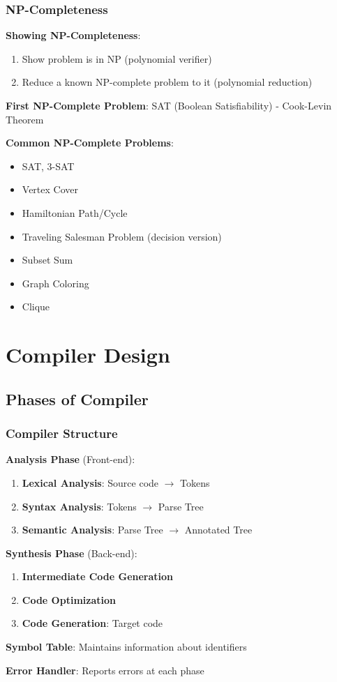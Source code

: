 \documentclass[12pt,a4paper]{report}
\begin{document}
\subsection{NP-Completeness}
\begin{concept}
\textbf{Showing NP-Completeness}:
\begin{enumerate}
    \item Show problem is in NP (polynomial verifier)
    \item Reduce a known NP-complete problem to it (polynomial reduction)
\end{enumerate}

\textbf{First NP-Complete Problem}: SAT (Boolean Satisfiability) - Cook-Levin Theorem

\textbf{Common NP-Complete Problems}:
\begin{itemize}
    \item SAT, 3-SAT
    \item Vertex Cover
    \item Hamiltonian Path/Cycle
    \item Traveling Salesman Problem (decision version)
    \item Subset Sum
    \item Graph Coloring
    \item Clique
\end{itemize}
\end{concept}

\chapter{Compiler Design}

\section{Phases of Compiler}

\subsection{Compiler Structure}
\begin{concept}
\textbf{Analysis Phase} (Front-end):
\begin{enumerate}
    \item \textbf{Lexical Analysis}: Source code $\to$ Tokens
    \item \textbf{Syntax Analysis}: Tokens $\to$ Parse Tree
    \item \textbf{Semantic Analysis}: Parse Tree $\to$ Annotated Tree
\end{enumerate}

\textbf{Synthesis Phase} (Back-end):
\begin{enumerate}
    \item \textbf{Intermediate Code Generation}
    \item \textbf{Code Optimization}
    \item \textbf{Code Generation}: Target code
\end{enumerate}

\textbf{Symbol Table}: Maintains information about identifiers

\textbf{Error Handler}: Reports errors at each phase
\end{concept}
\end{document}
